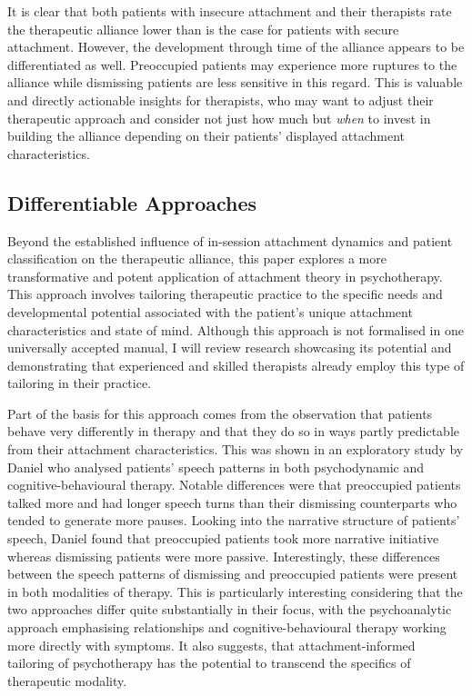 \documentclass[12pt]{report}
\begin{document}
It is clear that both patients with insecure attachment and their therapists rate the therapeutic alliance lower than is the case for patients with secure attachment.
However, the development through time of the alliance appears to be differentiated as well. Preoccupied patients may experience more ruptures to the alliance while dismissing patients are less sensitive in this regard.
This is valuable and directly actionable insights for therapists, who may want to adjust their therapeutic approach and consider not just how much but \textit{when} to invest in building the alliance depending on their patients' displayed attachment characteristics.

\subsection{Differentiable Approaches}
\label{sec:Differentiable approaches}
Beyond the established influence of in-session attachment dynamics and patient classification on the therapeutic alliance, this paper explores a more transformative and potent application of attachment theory in psychotherapy.
This approach involves tailoring therapeutic practice to the specific needs and developmental potential associated with the patient's unique attachment characteristics and state of mind.
Although this approach is not formalised in one universally accepted manual, I will review research showcasing its potential and demonstrating that experienced and skilled therapists already employ this type of tailoring in their practice.

Part of the basis for this approach comes from the observation that patients behave very differently in therapy and that they do so in ways partly predictable from their attachment characteristics. This was shown in an exploratory study by Daniel \cite{Daniel2011} who analysed patients' speech patterns in both psychodynamic and cognitive-behavioural therapy.
Notable differences were that preoccupied patients talked more and had longer speech turns than their dismissing counterparts who tended to generate more pauses.
Looking into the narrative structure of patients' speech, Daniel found that preoccupied patients took more narrative initiative whereas dismissing patients were more passive.
Interestingly, these differences between the speech patterns of dismissing and preoccupied patients were present in both modalities of therapy. This is particularly interesting considering that the two approaches differ quite substantially in their focus, with the psychoanalytic approach emphasising relationships and cognitive-behavioural therapy working more directly with symptoms.
It also suggests, that attachment-informed tailoring of psychotherapy has the potential to transcend the specifics of therapeutic modality.
\end{document}
